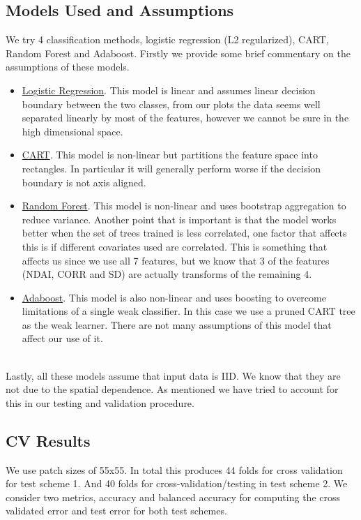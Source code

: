\documentclass[11pt, letterpaper, journal]{IEEEtran}
\begin{document}
\subsection{Models Used and Assumptions}
We try 4 classification methods, logistic regression (L2 regularized), CART, Random Forest and Adaboost. Firstly we provide some brief commentary on the assumptions of these models.
\begin{itemize}
    \item \underline{Logistic Regression}. This model is linear and assumes linear decision boundary between the two classes, from our plots the data seems well separated linearly by most of the features, however we cannot be sure in the high dimensional space.
    \item \underline{CART}. This model is non-linear but partitions the feature space into rectangles. In particular it will generally perform worse if the decision boundary is not axis aligned. 
    \item \underline{Random Forest}. This model is non-linear and uses bootstrap aggregation to reduce variance. Another point that is important is that the model works better when the set of trees trained is less correlated, one factor that affects this is if different covariates used are correlated. This is something that affects us since we use all 7 features, but we know that 3 of the features (NDAI, CORR and SD) are actually transforms of the remaining 4.
    \item \underline{Adaboost}. This model is also non-linear and uses boosting to overcome limitations of a single weak classifier. In this case we use a pruned CART tree as the weak learner. There are not many assumptions of this model that affect our use of it.
\end{itemize}
\\
Lastly, all these models assume that input data is IID. We know that they are not due to the spatial dependence. As mentioned we have tried to account for this in our testing and validation procedure. 

\subsection{CV Results}
We use patch sizes of 55x55. In total this produces 44 folds for cross validation for test scheme 1. And 40 folds for cross-validation/testing in test scheme 2. We consider two metrics, accuracy and balanced accuracy for computing the cross validated error and test error for both test schemes. 
\end{document}
